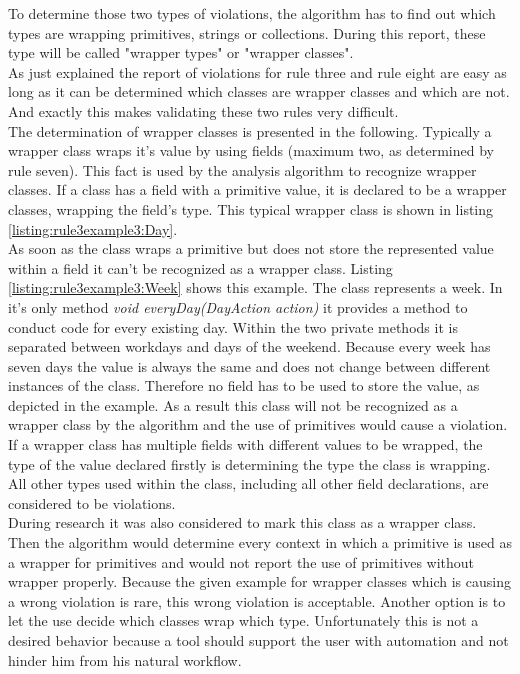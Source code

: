 To determine those two types of violations, the algorithm has to find out which types are wrapping primitives, strings or collections. During this report, these type will be called "wrapper types" or "wrapper classes". 
\\

As just explained the report of violations for rule three and rule eight are easy as long as it can be determined which classes are wrapper classes and which are not. And exactly this makes validating these two rules very difficult. 
\\

The determination of wrapper classes is presented in the following. Typically a wrapper class wraps it's value by using fields (maximum two, as determined by rule seven). This fact is used by the analysis algorithm to recognize wrapper classes. If a class has a field with a primitive value, it is declared to be a wrapper classes, wrapping the field's type. This typical wrapper class is shown in listing \ref{listing:rule3example3:Day}. 
\\

As soon as the class wraps a primitive but does not store the represented value within a field it can't be recognized as a wrapper class. Listing \ref{listing:rule3example3:Week} shows this example. The class represents a week. In it's only method \textit{void everyDay(DayAction action)} it provides a method to conduct code for every existing day. Within the two private methods it is separated between workdays and days of the weekend. Because every week has seven days the value is always the same and does not change between different instances of the class. Therefore no field has to be used to store the value, as depicted in the example. As a result this class will not be recognized as a wrapper class by the algorithm and the use of primitives would cause a violation. 
\\

If a wrapper class has multiple fields with different values to be wrapped, the type of the value declared firstly is determining the type the class is wrapping. All other types used within the class, including all other field declarations, are considered to be violations. 
\\

During research it was also considered to mark this class as a wrapper class. Then the algorithm would determine every context in which a primitive is used as a wrapper for primitives and would not report the use of primitives without wrapper properly. Because the given example for wrapper classes which is causing a wrong violation is rare, this wrong violation is acceptable. Another option is to let the use decide which classes wrap which type. Unfortunately this is not a desired behavior because a tool should support the user with automation and not hinder him from his natural workflow. 
\\

